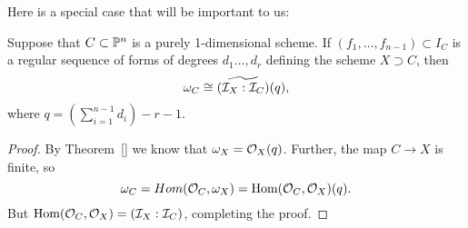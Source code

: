 % 
%
%

Here is a special case that will be important to us:
\begin{proposition}
 Suppose that 
$C \subset {\mathbb P}^{n}$ is a purely 1-dimensional scheme. If $(f_{1}, \dots, f_{n-1}) \subset I_{C}$ is a regular sequence of forms of degrees $d_{1}\dots,d_{r}$ defining the scheme $X\supset C$, then 
$$
\omega_{C}\cong \widetilde{({\mathcal I}_{X}:{\mathcal I}_{C})}(q),
$$
where $q = (\sum_{i=1}^{n-1} d_{i}) -r-1.$
\end{proposition}
\begin{proof}
 By Theorem~\ref{} we know that $\omega_{X} = {\mathcal O}_{X}(q)$. Further, the map
 $C\to X$ is finite, so 
 $$
 \omega_{C} = Hom({\mathcal O}_{C}, \omega_{X}) = \operatorname{Hom}({\mathcal O}_{C}, {\mathcal O}_{X})(q).
 $$
 But $\operatorname{Hom}({\mathcal O}_{C}, {\mathcal O}_{X}) = ({\mathcal I}_{X}:{\mathcal I}_{C})$, completing the proof.
\end{proof}


